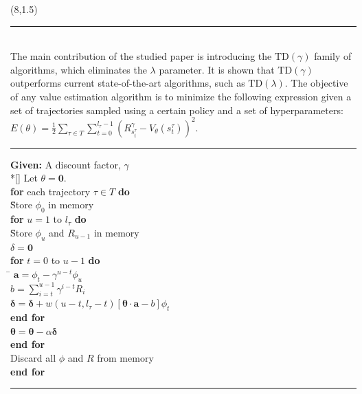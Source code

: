 \documentclass[a0]{a0poster}
\def\Head#1{\noindent{\LARGE\color{bluegray} #1}\bigskip}
\begin{document}
\begin{textblock}{7.0}(8,1.5)

\medskip
\hrule\medskip
\Head{$\text{TD}(\gamma)$ Algorithm}\\

The main contribution of the studied paper is introducing the
$\text{TD}(\gamma)$ family of algorithms, which eliminates the $\lambda$
parameter. It is shown that $\text{TD}(\gamma)$ outperforms current
state-of-the-art algorithms, such as $\text{TD}(\lambda)$. The objective of any
value estimation algorithm is to minimize the following expression given a set
of trajectories sampled using a certain policy and a set of hyperparameters:
$E(\theta) = \frac{1}{2} \sum_{\tau \in T} \sum_{t = 0}^{l_\tau - 1}
{(R_{s_t^\tau}^\gamma - V_\theta(s_t^\tau))}^2$.

\noindent\rule[-5pt]{.9\textwidth}{0.4pt}
{\footnotesize
\begin{tabbing}
    {\bf Given:} A discount factor, $\gamma$ \\*[\smallskipamount]
    Let $\theta= \boldsymbol{0}$. \\
    {\bf for} each trajectory $\tau \in T$ {\bf do} \\
      \qquad \= Store $\phi_0$ in memory \\
      \> {\bf for} $u = 1$ to $l_\tau$ {\bf do} \\
      \> \qquad \= Store $\phi_u$ and $R_{u - 1}$ in memory \\
      \>  \> $\delta = \boldsymbol{0}$ \\
      \>  \> {\bf for} $t = 0$ to $u - 1$ {\bf do} \\
      \>  \> \qquad \= $\boldsymbol{a} = \phi_t - \gamma^{u - t} \phi_u$ \\
      \>  \>  \> $b = \sum_{i = t}^{u - 1} \gamma^{i - t} R_i$ \\
      \>  \>  \> $\boldsymbol{\delta} = \boldsymbol{\delta} + w(u - t, l_{\tau} - t)[\boldsymbol{\theta} \cdot \boldsymbol{a} - b] \phi_t$ \\
      \>  \> {\bf end for} \\
      \>  \> $\boldsymbol{\theta} = \boldsymbol{\theta} - \alpha \boldsymbol{\delta}$ \\
      \> {\bf end for} \\
      \> Discard all $\phi$ and $R$ from memory \\
    {\bf end for}
\end{tabbing}}
\noindent\rule[10pt]{.9\textwidth}{0.4pt}


\end{textblock}
\end{document}
